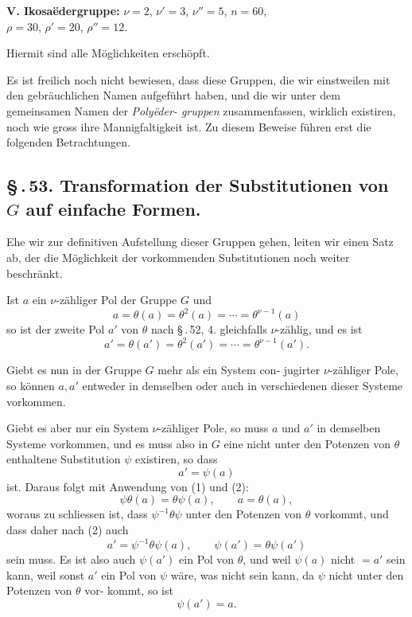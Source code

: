 \documentclass[12pt,a4paper]{article}
\theoremstyle{plain}
\theoremstyle{definition}
\theoremstyle{remark}
\newcommand{\sect}[1]{\S\,.\,#1.}
\begin{document}
\textbf{V. Ikosa\"edergruppe:} $\nu = 2$, $\nu' = 3$, $\nu'' = 5$, $n = 60$,\\
$\rho = 30$, $\rho' = 20$, $\rho'' = 12$.

Hiermit sind alle M\"oglichkeiten ersch\"opft.

Es ist freilich noch nicht bewiesen, dass diese Gruppen, die
wir einstweilen mit den gebr\"auchlichen Namen aufgef\"uhrt haben,
und die wir unter dem gemeinsamen Namen der \emph{Poly\"eder-
gruppen} zusammenfassen, wirklich existiren, noch wie gross
ihre Mannigfaltigkeit ist. Zu diesem Beweise f\"uhren erst die
folgenden Betrachtungen.


\subsection*{\sect{53} Transformation der Substitutionen von $G$ auf einfache Formen.}

Ehe wir zur definitiven Aufstellung dieser Gruppen gehen,
leiten wir einen Satz ab, der die M\"oglichkeit der vorkommenden
Substitutionen noch weiter beschr\"ankt.

Ist $a$ ein $\nu$-z\"ahliger Pol der Gruppe $G$ und
\begin{equation}\label{eq:53_1}
a = \theta(a) = \theta^2(a) = \cdots = \theta^{\nu-1}(a)\tag{1}
\end{equation}
so ist der zweite Pol $a'$ von $\theta$ nach \S\,.\,52, 4. gleichfalls $\nu$-z\"ahlig,
und es ist
\begin{equation}\label{eq:53_2}
a' = \theta(a') = \theta^2(a') = \cdots = \theta^{\nu-1}(a').\tag{2}
\end{equation}

Giebt es nun in der Gruppe $G$ mehr als ein System con-
jugirter $\nu$-z\"ahliger Pole, so k\"onnen $a, a'$ entweder in demselben
oder auch in verschiedenen dieser Systeme vorkommen.

Giebt es aber nur ein System $\nu$-z\"ahliger Pole, so muss $a$
und $a'$ in demselben Systeme vorkommen, und es muss also in $G$
eine nicht unter den Potenzen von $\theta$ enthaltene Substitution $\psi$
existiren, so dass
\begin{equation}\label{eq:53_3}
a' = \psi(a)\tag{3}
\end{equation}
ist. Daraus folgt mit Anwendung von (1) und (2):
\[
\psi\theta(a) = \theta\psi(a),\qquad a = \theta(a),
\]
woraus zu schliessen ist, dass $\psi^{-1}\theta\psi$ unter den Potenzen von
$\theta$ vorkommt, und dass daher nach (2) auch
\[
a' = \psi^{-1}\theta\psi(a),\qquad \psi(a') = \theta\psi(a')
\]
sein muss. Es ist also auch $\psi(a')$ ein Pol von $\theta$, und weil $\psi(a)$
nicht $= a'$ sein kann, weil sonst $a'$ ein Pol von $\psi$ w\"are, was
nicht sein kann, da $\psi$ nicht unter den Potenzen von $\theta$ vor-
kommt, so ist
\begin{equation}\label{eq:53_4}
\psi(a') = a.\tag{4}
\end{equation}
\end{document}
